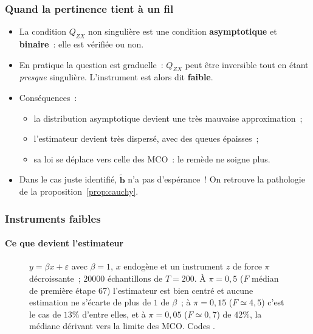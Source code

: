 \documentclass[10pt]{beamer}
\begin{document}
\begin{frame}
  \frametitle{Quand la pertinence tient à un fil}

  \begin{itemize}

  \item La condition $Q_{ZX}$ non singulière est une condition
    \textbf{asymptotique} et \textbf{binaire}~: elle est vérifiée ou non.\newline

  \item En pratique la question est graduelle~: $Q_{ZX}$ peut être inversible
    tout en étant \emph{presque} singulière. L'instrument est alors dit
    \textbf{faible}.\newline

  \item Conséquences~:
    \begin{itemize}
    \item la distribution asymptotique devient une très mauvaise approximation~;
    \item l'estimateur devient très dispersé, avec des queues épaisses~;
    \item sa loi se déplace vers celle des MCO~: le remède ne soigne plus.
    \end{itemize}

  \item[\dbend] Dans le cas juste identifié, $\tilde{\mathbf b}$ n'a pas
    d'espérance~! On retrouve la pathologie de la proposition~\ref{prop:cauchy}.

  \end{itemize}

\end{frame}


\begin{frame}[c]
  \frametitle{Instruments faibles}
  \framesubtitle{Ce que devient l'estimateur}

  \begin{figure}
    \centering
    \scalebox{.42}{}
    \caption{$y=\beta x+\varepsilon$ avec $\beta=1$, $x$ endogène et un
      instrument $z$ de force $\pi$ décroissante~; $20000$ échantillons
      de $T=200$. À $\pi=0{,}5$ ($F$ médian de première étape $67$) l'estimateur
      est bien centré et aucune estimation ne s'écarte de plus de $1$
      de $\beta$~; à $\pi=0{,}15$ ($F\simeq 4{,}5$) c'est le cas de $13\%$ d'entre
      elles, et à $\pi=0{,}05$ ($F\simeq 0{,}7$) de $42\%$, la médiane dérivant
      vers la limite des MCO. Codes .}
  \end{figure}

\end{frame}
\end{document}

